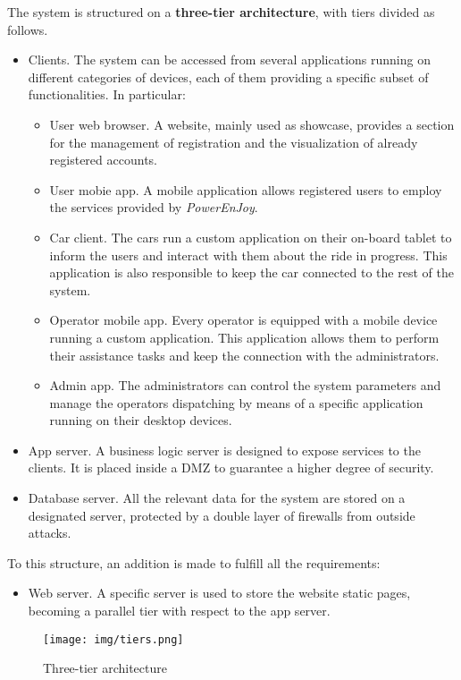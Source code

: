 The system is structured on a \textbf{three-tier architecture}, with tiers divided as follows.
\begin{itemize}
	\item{Clients.} The system can be accessed from several applications running on different categories of devices, each of them providing a specific subset of functionalities. In particular:
	\begin{itemize}
		\item{User web browser.} A website, mainly used as showcase, provides a section for the management of registration and the visualization of already registered accounts.
		\item{User mobie app.} A mobile application allows registered users to employ the services provided by \textit{PowerEnJoy}.
		\item{Car client.} The cars run a custom application on their on-board tablet to inform the users and interact with them about the ride in progress. This application is also responsible to keep the car connected to the rest of the system.
		\item{Operator mobile app.} Every operator is equipped with a mobile device running a custom application. This application allows them to perform their assistance tasks and keep the connection with the administrators.
		\item{Admin app.} The administrators can control the system parameters and manage the operators dispatching by means of a specific application running on their desktop devices.
	\end{itemize}
	\item{App server.} A business logic server is designed to expose services to the clients. It is placed inside a DMZ to guarantee a higher degree of security.
	\item{Database server.} All the relevant data for the system are stored on a designated server, protected by a double layer of firewalls from outside attacks.
\end{itemize}
To this structure, an addition is made to fulfill all the requirements:
	\begin{itemize}
		\item{Web server.} A specific server is used to store the website static pages, becoming a parallel tier with respect to the app server.
	\end{itemize}

\begin{figure}[h]
	\texttt{[image: img/tiers.png]} %
	\caption{Three-tier architecture}
\end{figure}
\FloatBarrier

